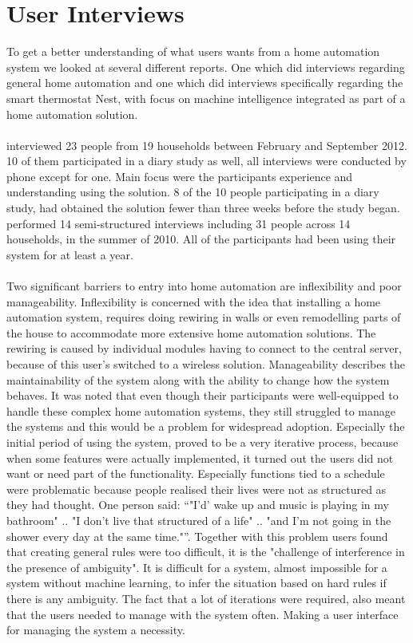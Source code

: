 \section{User Interviews}
\label{sec:interviewReports}
To get a better understanding of what users wants from a home automation system we looked at several different reports. One \cite{HAInterviews} which did interviews regarding general home automation and one which did interviews specifically regarding the smart thermostat Nest\cite{AdaptiveInterviews}, with focus on machine intelligence integrated as part of a home automation solution. 
\\\\
\citet{AdaptiveInterviews} interviewed 23 people from 19 households between February and September 2012. 10 of them participated in a diary study as well, all interviews were conducted by phone except for one. Main focus were the participants experience and understanding using the solution. 8 of the 10 people participating in a diary study, had obtained the solution fewer than three weeks before the study began. 
\citet{HAInterviews} performed 14 semi-structured interviews including 31 people across 14 households, in the summer of 2010. All of the participants had been using their system for at least a year.
\\\\
Two significant barriers to entry into home automation are inflexibility and poor manageability\cite{HAInterviews}. Inflexibility is concerned with the idea that installing a home automation system, requires doing rewiring in walls or even remodelling parts of the house to accommodate more extensive home automation solutions. The rewiring is caused by individual modules having to connect to the central server, because of this user's switched to a wireless solution\cite{HAInterviews}.
Manageability describes the maintainability of the system along with the ability to change how the system behaves. It was\cite{HAInterviews} noted that even though their participants were well-equipped to handle these complex home automation systems, they still struggled to manage the systems and this would be a problem for widespread adoption. Especially the initial period of using the system, proved to be a very iterative process, because when some features were actually implemented, it turned out the users did not want or need part of the functionality. Especially functions tied to a schedule were problematic because people realised their lives were not as structured as they had thought. One person said: \enquote{"I'd' wake up and music is playing in my bathroom" .. "I don't live that structured of a life" .. "and I'm not going in the shower every day at the same time."}. Together with this problem users found that creating general rules were too difficult, it is the "challenge of interference in the presence of ambiguity"\cite{HAInterviews}. It is difficult for a system, almost impossible for a system without machine learning, to infer the situation based on hard rules if there is any ambiguity. The fact that a lot of iterations were required, also meant that the users needed to manage with the system often. Making a user interface for managing the system a necessity.
